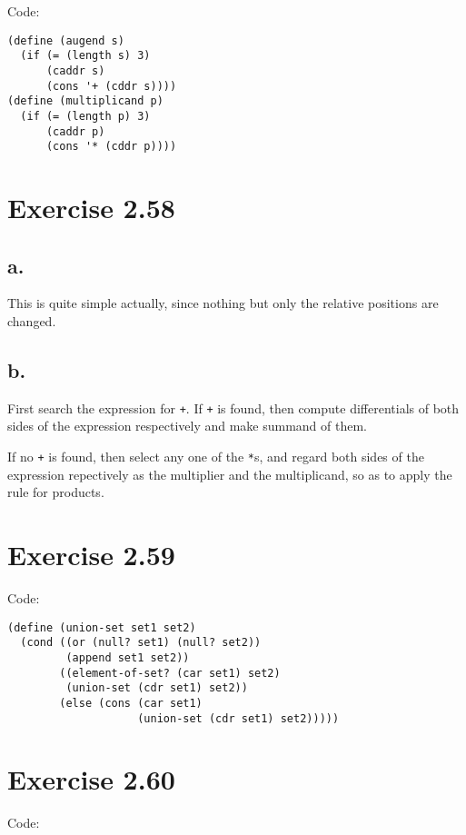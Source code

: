 \documentclass[../main.tex]{subfiles}
\begin{document}
Code:

\begin{lstlisting}
(define (augend s)
  (if (= (length s) 3)
      (caddr s)
      (cons '+ (cddr s))))
(define (multiplicand p)
  (if (= (length p) 3)
      (caddr p)
      (cons '* (cddr p))))
\end{lstlisting}

\section{Exercise 2.58}

\subsection{a.}

This is quite simple actually, since
 nothing but only the relative positions
 are changed.

\subsection{b.}

First search the expression for \lstinline{+}.
 If \lstinline{+} is found, then compute
 differentials of both sides of the expression
 respectively and make summand of them.

If no \lstinline{+} is found, then select any
 one of the \lstinline{*}s, and regard both sides
 of the expression repectively as the multiplier
 and the multiplicand, so as to apply the rule
 for products.

\section{Exercise 2.59}

Code:

\begin{lstlisting}
(define (union-set set1 set2)
  (cond ((or (null? set1) (null? set2))
         (append set1 set2))
        ((element-of-set? (car set1) set2)
         (union-set (cdr set1) set2))
        (else (cons (car set1)
                    (union-set (cdr set1) set2)))))
\end{lstlisting}

\section{Exercise 2.60}

Code:
\end{document}
